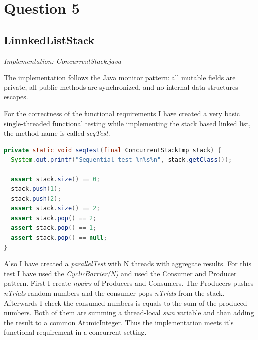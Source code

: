 \documentclass[format=acmsmall, review=false, screen=true]{acmart}
\begin{document}
\section{Question 5}

\subsection{LinnkedListStack}

\textit{Implementation: ConcurrentStack.java}

The implementation follows the Java monitor pattern: all mutable fields are private,
all public methods are synchronized, and no internal data structures escapes.

For the correctness of the functional requirements I have created a very
basic single-threaded functional testing while implementing the stack based
linked list, the method name is called \textit{seqTest}.

\begin{lstlisting}[language=java]
private static void seqTest(final ConcurrentStackImp stack) {
  System.out.printf("Sequential test %n%s%n", stack.getClass());

  assert stack.size() == 0;
  stack.push(1);
  stack.push(2);
  assert stack.size() == 2;
  assert stack.pop() == 2;
  assert stack.pop() == 1;
  assert stack.pop() == null;
}
\end{lstlisting}

Also I have created a \textit{parallelTest} with N threads with aggregate results.
For this test I have used the \textit{CyclicBarrier(N)} and used the Consumer and Producer pattern. First I create \textit{npairs} of Producers and Consumers. The Producers
pushes \textit{nTrials} random numbers and the consumer pops \textit{nTrials} from the stack.
Afterwards I check the consumed numbers is equals to the sum of the produced
numbers. Both of them are summing a thread-local \textit{sum} variable and than adding
the result to a common  AtomicInteger. Thus the implementation meets it's functional
requirement in a concurrent setting.
\end{document}
